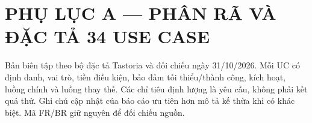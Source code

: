 \chapter{PHỤ LỤC A --- PHÂN RÃ VÀ ĐẶC TẢ 34 USE CASE}
Bản biên tập theo bộ đặc tả Tastoria và đối chiếu ngày 31/\allowbreak{}10/\allowbreak{}2026. Mỗi UC có định danh, vai trò, tiền điều kiện, bảo đảm tối thiểu/\allowbreak{}thành công, kích hoạt, luồng chính và luồng thay thế. Các chỉ tiêu định lượng là yêu cầu, không phải kết quả thử. Ghi chú cập nhật của báo cáo ưu tiên hơn mô tả kế thừa khi có khác biệt. Mã FR/\allowbreak{}BR giữ nguyên để đối chiếu nguồn.
